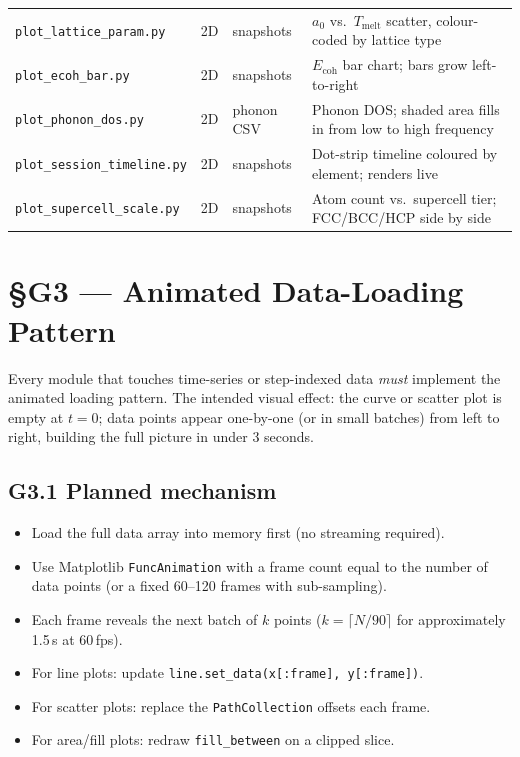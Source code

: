 \documentclass[11pt,a4paper]{article}
\begin{document}
\begin{center}
\begin{tabular}{lllp{5.2cm}}
\texttt{plot\_lattice\_param.py} & 2D & snapshots     & $a_0$ vs.\ $T_\text{melt}$ scatter,
                                                         colour-coded by lattice type \\
\texttt{plot\_ecoh\_bar.py}      & 2D & snapshots     & $E_\text{coh}$ bar chart; bars
                                                         grow left-to-right \\
\texttt{plot\_phonon\_dos.py}    & 2D & phonon CSV    & Phonon DOS; shaded area fills in
                                                         from low to high frequency \\
\texttt{plot\_session\_timeline.py} & 2D & snapshots  & Dot-strip timeline coloured
                                                         by element; renders live \\
\texttt{plot\_supercell\_scale.py}  & 2D & snapshots  & Atom count vs.\ supercell tier;
                                                         FCC/BCC/HCP side by side \\
\bottomrule
\end{tabular}
\end{center}

\section{\S{}G3 --- Animated Data-Loading Pattern}

Every module that touches time-series or step-indexed data \emph{must} implement
the animated loading pattern.
The intended visual effect: the curve or scatter plot is empty at $t=0$;
data points appear one-by-one (or in small batches) from left to right,
building the full picture in under 3 seconds.

\subsection{G3.1 Planned mechanism}
\begin{itemize}[leftmargin=2em]
  \item Load the full data array into memory first (no streaming required).
  \item Use Matplotlib \texttt{FuncAnimation} with a frame count equal to
        the number of data points (or a fixed 60--120 frames with sub-sampling).
  \item Each frame reveals the next batch of $k$ points
        ($k = \lceil N / 90 \rceil$ for approximately 1.5\,s at 60\,fps).
  \item For line plots: update \texttt{line.set\_data(x[:frame], y[:frame])}.
  \item For scatter plots: replace the \texttt{PathCollection} offsets each frame.
  \item For area/fill plots: redraw \texttt{fill\_between} on a clipped slice.
\end{itemize}
\end{document}
